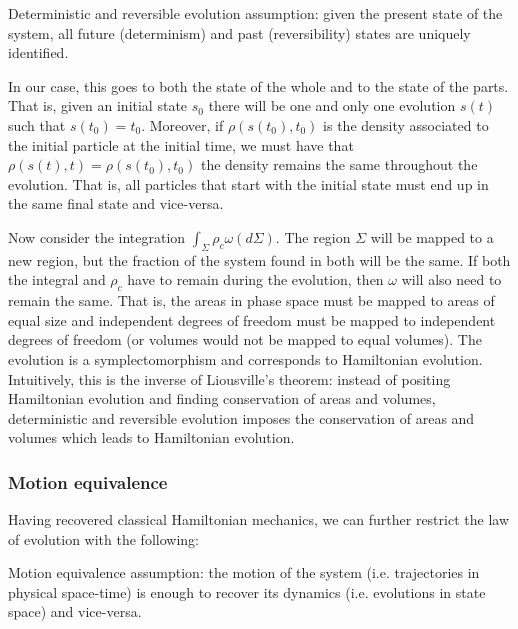 \documentclass[letterpaper]{article}
\begin{document}
Deterministic and reversible evolution assumption: given the present state of the system, all future (determinism) and past (reversibility) states are uniquely identified.

In our case, this goes to both the state of the whole and to the state of the parts. That is, given an initial state $s_0$ there will be one and only one evolution $s(t)$ such that $s(t_0) = t_0$. Moreover, if $\rho(s(t_0), t_0)$ is the density associated to the initial particle at the initial time, we must have that $\rho(s(t), t) = \rho(s(t_0), t_0)$ the density remains the same throughout the evolution. That is, all particles that start with the initial state must end up in the same final state and vice-versa.

Now consider the integration $\int_{\Sigma} \rho_c \omega(d\Sigma)$. The region $\Sigma$ will be mapped to a new region, but the fraction of the system found in both will be the same. If both the integral and $\rho_c$ have to remain during the evolution, then $\omega$ will also need to remain the same. That is, the areas in phase space must be mapped to areas of equal size and independent degrees of freedom must be mapped to independent degrees of freedom (or volumes would not be mapped to equal volumes). The evolution is a symplectomorphism and corresponds to Hamiltonian evolution. Intuitively, this is the inverse of Liousville's theorem: instead of positing Hamiltonian evolution and finding conservation of areas and volumes, deterministic and reversible evolution imposes the conservation of areas and volumes which leads to Hamiltonian evolution.


\subsubsection{Motion equivalence}

Having recovered classical Hamiltonian mechanics, we can further restrict the law of evolution with the following:

Motion equivalence assumption: the motion of the system (i.e. trajectories in physical space-time) is enough to recover its dynamics (i.e. evolutions in state space) and vice-versa.
\end{document}
